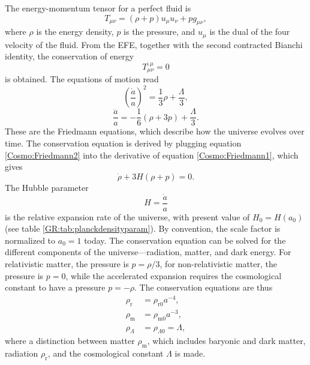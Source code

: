 \documentclass[12pt]{article}
\newcommand{\pr}[1]{\left(#1\right)}
\begin{document}
The energy-momentum tensor for a perfect fluid is
\begin{equation}\label{Cosmo:energy_momentum_tensor}
    T_{\mu\nu} = \pr{\rho + p}u_\mu u_\nu + p g_{\mu\nu},
\end{equation}
where $\rho$ is the energy density, $p$ is the pressure, and $u_\mu$ is the dual of the four velocity of the fluid. From the EFE, together with the second contracted Bianchi identity, the conservation of energy 
\begin{equation}\label{eqn:conservationeq}
    T_{\mu\nu}^{;\mu} = 0
\end{equation}
is obtained. The equations of motion read
\begin{equation}
    \left( \frac{\dot{a}}{a}\right)^2 = \frac{1}{3} \rho + \frac{\Lambda}{3}
    \label{Cosmo:Friedmann1},
\end{equation}
\begin{equation}
    \frac{\ddot{a}}{a} = -\frac{1}{6} \left( \rho + 3p  \right) + \frac{\Lambda}{3}.
    \label{Cosmo:Friedmann2}
\end{equation}
These are the Friedmann equations, which describe how the universe evolves over time. The conservation equation is derived by plugging equation \eqref{Cosmo:Friedmann2} into the derivative of equation \eqref{Cosmo:Friedmann1}, which gives
\begin{equation}
    \dot{\rho} + 3 H \pr{\rho + p} = 0.
\end{equation}
The Hubble parameter
\begin{equation}
    H = \frac{\dot{a}}{a}
\end{equation}
is the relative expansion rate of the universe, with present value of $H_0 = H(a_0)$ (see table \ref{GR:tab:planckdensityparam}). By convention, the scale factor is normalized to $a_0 = 1$ today. The conservation equation can be solved for the different components of the universe—radiation, matter, and dark energy. For relativistic matter, the pressure is $p = \rho/3$, for non-relativistic matter, the pressure is $p = 0$, while the accelerated expansion requires the cosmological constant to have a pressure $p = -\rho$. The conservation equations are thus
\begin{align}
    \rho_{\mathrm{r}} &= \rho_{{\mathrm{r}}0} a^{-4},\\
    \rho_{\mathrm{m}} &= \rho_{{\mathrm{m}}0} a^{-3},\\ 
    \rho_\Lambda &= \rho_{\Lambda0} = \Lambda,
\end{align}
where a distinction between matter $\rho_{\mathrm{m}}$, which includes baryonic and dark matter, radiation $\rho_{\mathrm{r}}$, and the cosmological constant $\Lambda$ is made. 
\end{document}
